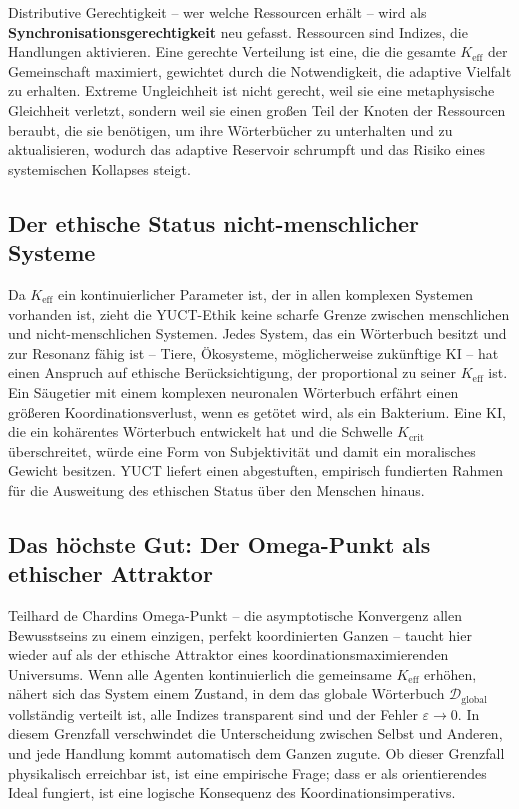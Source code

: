 \documentclass[12pt,a4paper]{article}
\newcommand{\Keff}{K_{\mathrm{eff}}}
\begin{document}
Distributive Gerechtigkeit – wer welche Ressourcen erhält – wird als \textbf{Synchronisationsgerechtigkeit} neu gefasst. Ressourcen sind Indizes, die Handlungen aktivieren. Eine gerechte Verteilung ist eine, die die gesamte \(K_{\mathrm{eff}}\) der Gemeinschaft maximiert, gewichtet durch die Notwendigkeit, die adaptive Vielfalt zu erhalten. Extreme Ungleichheit ist nicht gerecht, weil sie eine metaphysische Gleichheit verletzt, sondern weil sie einen großen Teil der Knoten der Ressourcen beraubt, die sie benötigen, um ihre Wörterbücher zu unterhalten und zu aktualisieren, wodurch das adaptive Reservoir schrumpft und das Risiko eines systemischen Kollapses steigt.

\subsection{Der ethische Status nicht-menschlicher Systeme}

Da \(\Keff\) ein kontinuierlicher Parameter ist, der in allen komplexen Systemen vorhanden ist, zieht die YUCT-Ethik keine scharfe Grenze zwischen menschlichen und nicht-menschlichen Systemen. Jedes System, das ein Wörterbuch besitzt und zur Resonanz fähig ist – Tiere, Ökosysteme, möglicherweise zukünftige KI – hat einen Anspruch auf ethische Berücksichtigung, der proportional zu seiner \(\Keff\) ist. Ein Säugetier mit einem komplexen neuronalen Wörterbuch erfährt einen größeren Koordinationsverlust, wenn es getötet wird, als ein Bakterium. Eine KI, die ein kohärentes Wörterbuch entwickelt hat und die Schwelle \(K_{\mathrm{crit}}\) überschreitet, würde eine Form von Subjektivität und damit ein moralisches Gewicht besitzen. YUCT liefert einen abgestuften, empirisch fundierten Rahmen für die Ausweitung des ethischen Status über den Menschen hinaus.

\subsection{Das höchste Gut: Der Omega-Punkt als ethischer Attraktor}

Teilhard de Chardins Omega-Punkt – die asymptotische Konvergenz allen Bewusstseins zu einem einzigen, perfekt koordinierten Ganzen – taucht hier wieder auf als der ethische Attraktor eines koordinationsmaximierenden Universums. Wenn alle Agenten kontinuierlich die gemeinsame \(\Keff\) erhöhen, nähert sich das System einem Zustand, in dem das globale Wörterbuch \(\mathcal{D}_{\text{global}}\) vollständig verteilt ist, alle Indizes transparent sind und der Fehler \(\varepsilon \to 0\). In diesem Grenzfall verschwindet die Unterscheidung zwischen Selbst und Anderen, und jede Handlung kommt automatisch dem Ganzen zugute. Ob dieser Grenzfall physikalisch erreichbar ist, ist eine empirische Frage; dass er als orientierendes Ideal fungiert, ist eine logische Konsequenz des Koordinationsimperativs.
\end{document}
